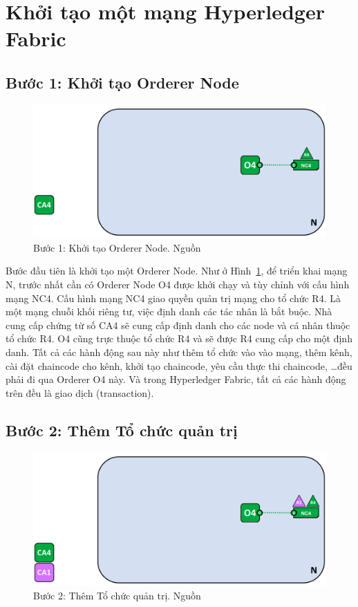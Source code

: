 \documentclass[../DoAn.tex]{subfiles}
\begin{document}
\section{Khởi tạo một mạng Hyperledger Fabric}
\subsection{Bước 1: Khởi tạo Orderer Node}

\begin{figure}[h]
  \centering
  \includegraphics[width=0.75\linewidth]{Hinhve/network.diagram.2.png}
  \caption[Bước 1: Khởi tạo Orderer Node]{Bước 1: Khởi tạo Orderer Node. Nguồn \cite{fabric_architecture}}
  \label{fig:fabric_step_1}
\end{figure}

Bước đầu tiên là khởi tạo một Orderer Node. Như ở Hình~\ref{fig:fabric_step_1}, để triển khai mạng
N, trước nhất cần có Orderer Node O4 được khởi chạy và tùy chỉnh với cấu hình
mạng NC4. Cấu hình mạng NC4 giao quyền quản trị mạng cho tổ chức R4. Là một
mạng chuỗi khối riêng tư, việc định danh các tác nhân là bắt buộc. Nhà cung cấp
chứng từ số CA4 sẽ cung cấp định danh cho các node và cá nhân thuộc tổ chức R4.
O4 cũng trực thuộc tổ chức R4 và sẽ được R4 cung cấp cho một định danh. Tất cả
các hành động sau này như thêm tổ chức vào vào mạng, thêm kênh, cài đặt
chaincode cho kênh, khởi tạo chaincode, yêu cầu thực thi chaincode, \dots đều phải
đi qua Orderer O4 này. Và trong Hyperledger Fabric, tất cả các hành động trên
đều là giao dịch (transaction).

\subsection{Bước 2: Thêm Tổ chức quản trị}

\begin{figure}[h]
  \centering
  \includegraphics[width=0.75\linewidth]{Hinhve/network.diagram.2.1.png}
  \caption[Bước 2: Thêm Tổ chức quản trị]{Bước 2: Thêm Tổ chức quản trị. Nguồn \cite{fabric_architecture}}
  \label{fig:fabric_step_2}
\end{figure}
\end{document}
